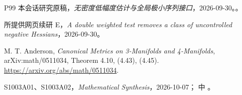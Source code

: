 \documentclass[UTF8,11pt,fontset=none]{ctexart}
\begin{document}
\begin{thebibliography}{P99}
\small
{} 本会话研究原稿，\emph{无密度低幅度估计与全局极小序列接口}，2026-09-30。。

 所提供网页续研 E，\emph{A double weighted test removes a class of uncontrolled negative Hessians}，2026-09-30。

 M. T. Anderson, \emph{Canonical Metrics on 3-Manifolds and 4-Manifolds}, arXiv:math/0511034, Theorem 4.10, (4.43), (4.45). \url{https://arxiv.org/abs/math/0511034}.

 S1003A01、S1003A02，\emph{Mathematical Synthesis}，2026-10-07； 中 。

\end{thebibliography}
\end{document}
